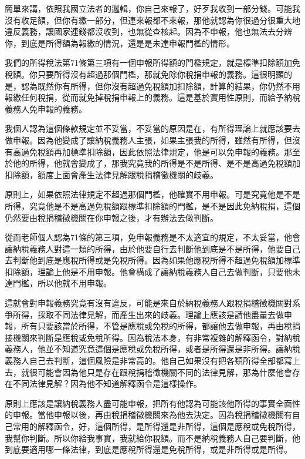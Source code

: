 \documentclass[]{ctexbook}
\begin{document}
簡單來講，依照我國立法者的邏輯，你自己來報了，好歹我收到一部分錢。可能我沒有收足額，但你有繳一部分，但連來報都不來報，那他就認為你很過分很重大地違反義務，讓國家連錢都沒收到，也無從查核起。因為不申報，他也無法去分辨你，到底是所得額為報繳的情況，還是是未達申報門檻的情形。

我們的所得稅法第71條第三項有一個申報所得額的門檻規定，就是標準扣除額加免稅額。你只要所得沒有超過那個門檻，那就免除你稅捐申報的義務。這很明顯的是，認為既然你有所得，但你沒有超過免稅額加扣除額，計算的結果，你仍然不用報繳任何稅捐，從而就免掉稅捐申報上的義務。這是基於實用性原則，而給予納稅義務人免申報的義務。

我個人認為這個條款規定並不妥當，不妥當的原因是在，有所得理論上就應該要去做申報。因為他變成了讓納稅義務人主張，如果主張我的所得，雖然有所得，但沒有高過免稅額再加標準扣除額，因此依照法律規定，他是可以免申報的義務。那至於他的所得，他就會變成了，那我究竟我的所得是不是所得、是不是高過免稅額加扣除額，額度上面會產生法律見解跟稅捐稽徵機關的歧義。

原則上，如果依照法律規定不超過那個門檻，他確實不用申報。可是究竟他是不是所得，究竟他是不是高過免稅額跟標準扣除額的門檻，是不是因此免納稅捐，這個仍然要由稅捐稽徵機關在你申報之後，才有辦法去做判斷。

從而老師個人認為71條的第三項，免申報義務是不太適宜的規定，不太妥當，他會讓納稅義務人對這一類的所得，由於他要自行去判斷他到底是不是所得，他要自己去判斷他到底是應稅所得或是免稅所得。因為如果他應稅所得不超過免稅額加標準扣除額，理論上他是不用申報。他會構成了讓納稅義務人自己去做判斷，只要他未達門檻，所以他就不用申報。

這就會對申報義務究竟有沒有違反，可能是來自於納稅義務人跟稅捐稽徵機關對系爭所得，採取不同法律見解，而產生出來的歧義。理論上應該是請他盡量去做申報，所有只要該當於所得，不管是應稅或免稅的所得，都讓他去做申報，再由稅捐接機關來判斷是應稅或免稅所得。因為稅法本身，有非常複雜的解釋函令，對納稅義務人，他並不知道究竟這個是應稅或免稅所得，或者是所得還是非所得。讓納稅義務人自己去判斷，這個風險是非常高的。他自己如果沒有把各類所得全部都寫上去，就很可能會因為他只是存在跟稅捐稽徵機關不同的法律見解，那為什麼他會存在不同法律見解？因為他不知道解釋函令是這樣操作。

原則上應該是讓納稅義務人盡可能申報，把所有他認為可能該他所得的事實全面性的申報。當他申報以後，再由稅捐稽徵機關來為他去決定。因為稅捐稽徵機關有自己常用的解釋函令，好，這個所得，是所得還是非所得，這個是應稅或免稅所得，我幫你判斷。所以你給我事實，我就給你稅額。而不是納稅義務人自己要判斷，他到底要適用哪一條法律，到底是應稅所得還是免稅所得，或是非所得或是所得。
\end{document}
